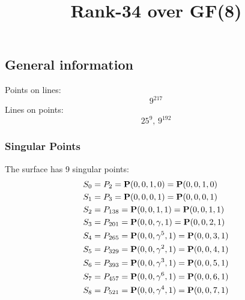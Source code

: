 \documentclass{article}
\newcommand\setTBstruts{\def\T{\rule{0pt}{2.6ex}}%
\def\B{\rule[-1.2ex]{0pt}{0pt}}}
\newcommand{\bP}{{\bf P}}
\begin{document}
 
\setTBstruts



{\allowdisplaybreaks%






\title{Rank-34 over GF(8)}
\author{}%
\maketitle%
%
{}



\subsection*{General information}
Points on lines:
$$
9^{217}$$
Lines on points:
$$
25^9,\,9^{192}$$
\subsubsection*{Singular Points}
The surface has 9 singular points:\\
\begin{align*}
S_{0} &= P_{2}=\bP(0, 0, 1, 0) = \bP(0, 0, 1, 0)\\
S_{1} &= P_{3}=\bP(0, 0, 0, 1) = \bP(0, 0, 0, 1)\\
S_{2} &= P_{138}=\bP(0, 0, 1, 1) = \bP(0, 0, 1, 1)\\
S_{3} &= P_{201}=\bP(0, 0, \gamma , 1) = \bP(0, 0, 2, 1)\\
S_{4} &= P_{265}=\bP(0, 0, \gamma^{5}, 1) = \bP(0, 0, 3, 1)\\
S_{5} &= P_{329}=\bP(0, 0, \gamma^{2}, 1) = \bP(0, 0, 4, 1)\\
S_{6} &= P_{393}=\bP(0, 0, \gamma^{3}, 1) = \bP(0, 0, 5, 1)\\
S_{7} &= P_{457}=\bP(0, 0, \gamma^{6}, 1) = \bP(0, 0, 6, 1)\\
S_{8} &= P_{521}=\bP(0, 0, \gamma^{4}, 1) = \bP(0, 0, 7, 1)\\
\end{align*}
}
\end{document}

